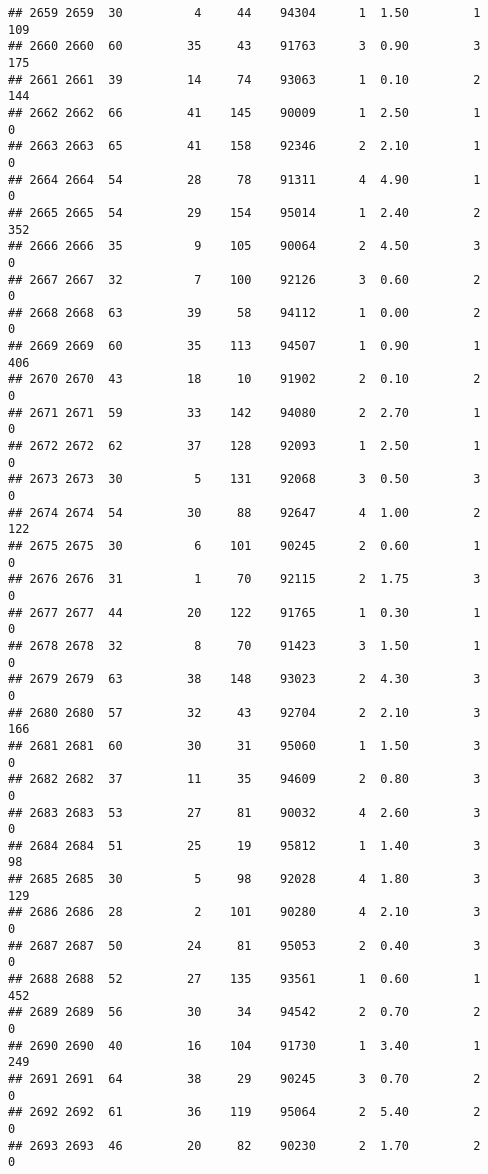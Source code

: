 \documentclass[
]{article}
\begin{document}
\begin{verbatim}
## 2659 2659  30          4     44    94304      1  1.50         1      109
## 2660 2660  60         35     43    91763      3  0.90         3      175
## 2661 2661  39         14     74    93063      1  0.10         2      144
## 2662 2662  66         41    145    90009      1  2.50         1        0
## 2663 2663  65         41    158    92346      2  2.10         1        0
## 2664 2664  54         28     78    91311      4  4.90         1        0
## 2665 2665  54         29    154    95014      1  2.40         2      352
## 2666 2666  35          9    105    90064      2  4.50         3        0
## 2667 2667  32          7    100    92126      3  0.60         2        0
## 2668 2668  63         39     58    94112      1  0.00         2        0
## 2669 2669  60         35    113    94507      1  0.90         1      406
## 2670 2670  43         18     10    91902      2  0.10         2        0
## 2671 2671  59         33    142    94080      2  2.70         1        0
## 2672 2672  62         37    128    92093      1  2.50         1        0
## 2673 2673  30          5    131    92068      3  0.50         3        0
## 2674 2674  54         30     88    92647      4  1.00         2      122
## 2675 2675  30          6    101    90245      2  0.60         1        0
## 2676 2676  31          1     70    92115      2  1.75         3        0
## 2677 2677  44         20    122    91765      1  0.30         1        0
## 2678 2678  32          8     70    91423      3  1.50         1        0
## 2679 2679  63         38    148    93023      2  4.30         3        0
## 2680 2680  57         32     43    92704      2  2.10         3      166
## 2681 2681  60         30     31    95060      1  1.50         3        0
## 2682 2682  37         11     35    94609      2  0.80         3        0
## 2683 2683  53         27     81    90032      4  2.60         3        0
## 2684 2684  51         25     19    95812      1  1.40         3       98
## 2685 2685  30          5     98    92028      4  1.80         3      129
## 2686 2686  28          2    101    90280      4  2.10         3        0
## 2687 2687  50         24     81    95053      2  0.40         3        0
## 2688 2688  52         27    135    93561      1  0.60         1      452
## 2689 2689  56         30     34    94542      2  0.70         2        0
## 2690 2690  40         16    104    91730      1  3.40         1      249
## 2691 2691  64         38     29    90245      3  0.70         2        0
## 2692 2692  61         36    119    95064      2  5.40         2        0
## 2693 2693  46         20     82    90230      2  1.70         2        0

\end{verbatim}
\end{document}
